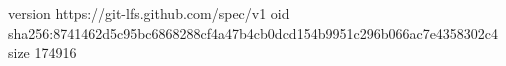 version https://git-lfs.github.com/spec/v1
oid sha256:8741462d5c95bc6868288cf4a47b4cb0dcd154b9951c296b066ac7e4358302c4
size 174916
